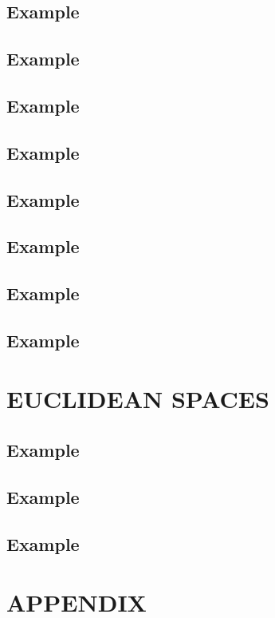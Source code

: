 \subsection*{\textbf{Example}}
\label{sec:28}
\subsection*{\textbf{Example}}
\label{sec:29}
\subsection*{\textbf{Example}}
\label{sec:30}
\subsection*{\textbf{Example}}
\label{sec:31}
\subsection*{\textbf{Example}}
\label{sec:32}
\subsection*{\textbf{Example}}
\label{sec:33}
\subsection*{\textbf{Example}}
\label{sec:34}
\subsection*{\textbf{Example}}
\label{sec:35}

\section{EUCLIDEAN SPACES}
\subsection*{\textbf{Example}}
\label{sec:36}

\subsection*{\textbf{Example}}
\label{sec:37}
\subsection*{\textbf{Example}}
\label{sec:38}

\section{APPENDIX}

